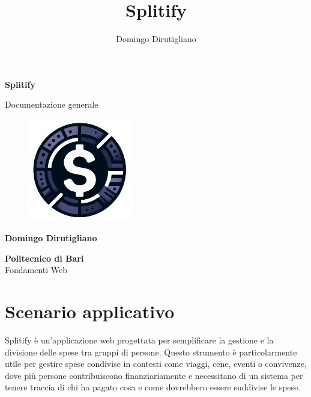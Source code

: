 \documentclass[11pt]{article}
\title{Splitify}
\author{Domingo Dirutigliano}
\begin{document}
\begin{titlepage}
   \begin{center}
       \vspace*{1cm}

       \LARGE{\textbf{Splitify}}

       \vspace{0.5cm}
        Documentazione generale

       \vspace{0.5cm}

       \begin{figure}[H]
    		\centering
    		\includegraphics[width=0.4\textwidth]{assets/logo.png}
		\end{figure}

       \vspace{0.5cm}

       \textbf{Domingo Dirutigliano}

       \vfill

       \textbf{Politecnico di Bari}\\
       Fondamenti Web

       \vspace{0.1cm}
   \end{center}
\end{titlepage}

\tableofcontents
\newpage
\section{Scenario applicativo}
Splitify è un'applicazione web progettata per semplificare la gestione e la divisione delle spese tra gruppi di persone. Questo strumento è particolarmente utile per gestire spese condivise in contesti come viaggi, cene, eventi o convivenze, dove più persone contribuiscono finanziariamente e necessitano di un sistema per tenere traccia di chi ha pagato cosa e come dovrebbero essere suddivise le spese.
\end{document}
